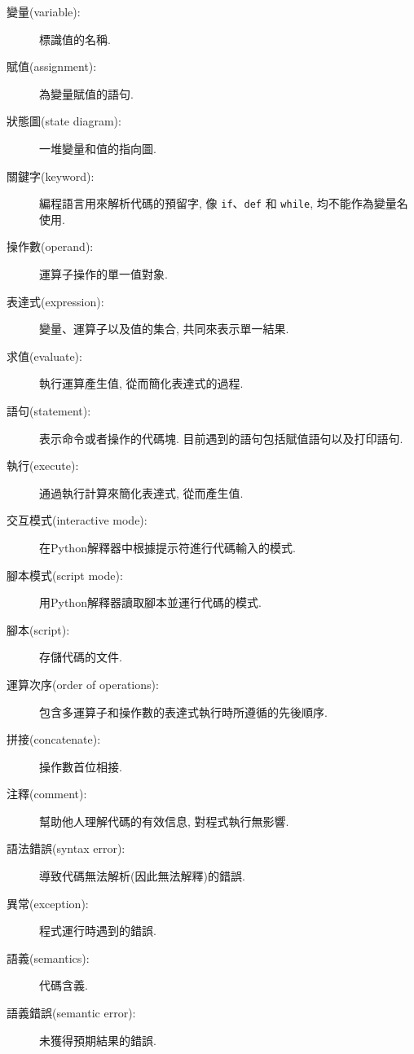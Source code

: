 \documentclass[10pt]{book}
\begin{document}
\begin{description}

\item[變量(variable):]  標識值的名稱. 

\item[賦值(assignment):]  為變量賦值的語句. 

\item[狀態圖(state diagram):]  一堆變量和值的指向圖. 

\item[關鍵字(keyword):]  編程語言用來解析代碼的預留字, 像 {\tt if}、{\tt  def} 和 {\tt while}, 
均不能作為變量名使用. 

\item[操作數(operand):]  運算子操作的單一值對象. 

\item[表達式(expression):]  變量、運算子以及值的集合, 共同來表示單一結果. 

\item[求值(evaluate):]  執行運算產生值, 從而簡化表達式的過程. 

\item[語句(statement):]  表示命令或者操作的代碼塊. 目前遇到的語句包括賦值語句以及打印語句. 

\item[執行(execute):]  通過執行計算來簡化表達式, 從而產生值.

\item[交互模式(interactive mode):] 在Python解釋器中根據提示符進行代碼輸入的模式. 

\item[腳本模式(script mode):] 用Python解釋器讀取腳本並運行代碼的模式. 

\item[腳本(script):] 存儲代碼的文件. 

\item[運算次序(order of operations):]  包含多運算子和操作數的表達式執行時所遵循的先後順序. 

\item[拼接(concatenate):]  操作數首位相接. 

\item[注釋(comment):]  幫助他人理解代碼的有效信息, 對程式執行無影響. 

\item[語法錯誤(syntax error):] 導致代碼無法解析(因此無法解釋)的錯誤. 

\item[異常(exception):]  程式運行時遇到的錯誤. 

\item[語義(semantics):]  代碼含義. 

\item[語義錯誤(semantic error):]   未獲得預期結果的錯誤. 

\end{description}
\end{document}
